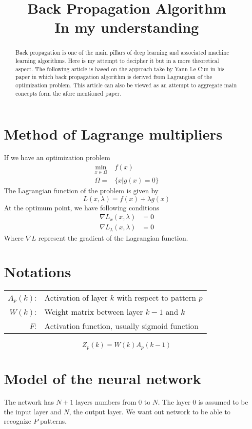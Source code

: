 \documentclass[10pt]{article}
\title{Back Propagation Algorithm\\{\normalsize  In my understanding}}
\author{}
\date{}
\newenvironment{vardef}
{\begin{center} \begin{tabular}{>{$}r<{$\;:}l} }
{\end{tabular} \end{center}}
\begin{document}
\maketitle
\begin{abstract}
Back propagation is one of the main pillars of deep learning and associated machine learning algorithms.
Here is my attempt to decipher it but in a more theoretical aspect.
The following article is based on the approach take by Yann Le Cun in his paper \cite{le1988theoretical} in which back propagation algorithm is derived from Lagrangian of the optimization problem.
This article can also be viewed as an attempt to aggregate main concepts form the afore mentioned paper.
\end{abstract}

\section{Method of Lagrange multipliers}

If we have an optimization problem 
\begin{align}
\min_{x\in \Omega} & f(x)\\
\Omega =& \{x| g(x) =0\} \nonumber
\end{align}
The Lagrangian function of the problem is given by
\begin{equation}
	L(x,\lambda) = f(x) + \lambda g(x)
\end{equation}
At the optimum point, we have following conditions
\begin{align}
	\nabla L_x(x,\lambda) &= 0\\ 
	\nabla L_\lambda(x,\lambda) &= 0 
\end{align}
Where $\nabla L$ represent the gradient of the Lagrangian function.

\section{Notations}
\begin{vardef}
	A_p(k) & Activation of layer $k$ with respect to pattern $p$\\
	W(k) & Weight matrix between layer $k-1$ and $k$\\
	F & Activation function, usually sigmoid function
\end{vardef}
$$	Z_p(k)= W(k)A_p(k-1)$$


\section{Model of the neural network}
The network has $N+1$ layers numbers from $0$ to $N$. The layer $0$ is assumed to be  the input layer and $N$, the output layer.
We want out network to be able to recognize $P$ patterns. 
\end{document}
